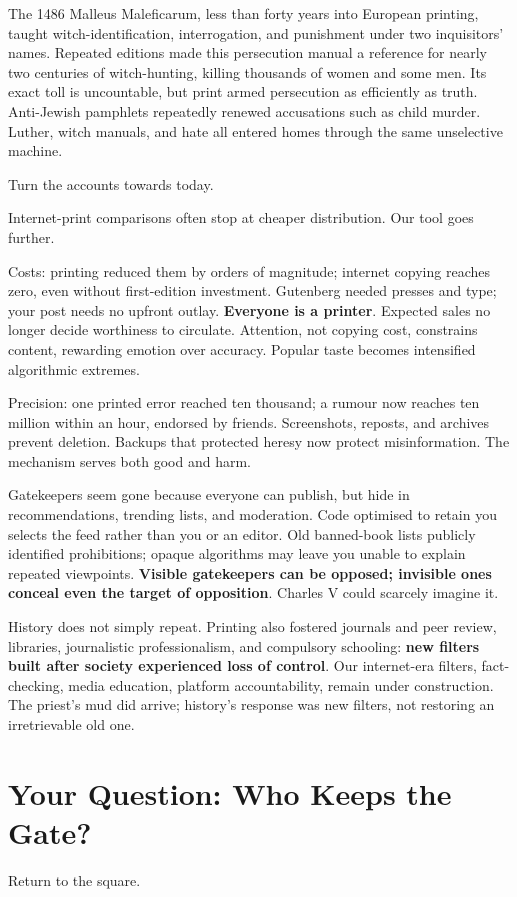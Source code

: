 The 1486 Malleus Maleficarum, less than forty years into European printing, taught witch-identification, interrogation, and punishment under two inquisitors' names. Repeated editions made this persecution manual a reference for nearly two centuries of witch-hunting, killing thousands of women and some men. Its exact toll is uncountable, but print armed persecution as efficiently as truth. Anti-Jewish pamphlets repeatedly renewed accusations such as child murder. Luther, witch manuals, and hate all entered homes through the same unselective machine.

Turn the accounts towards today.

Internet-print comparisons often stop at cheaper distribution. Our tool goes further.

Costs: printing reduced them by orders of magnitude; internet copying reaches zero, even without first-edition investment. Gutenberg needed presses and type; your post needs no upfront outlay. \textbf{Everyone is a printer}. Expected sales no longer decide worthiness to circulate. Attention, not copying cost, constrains content, rewarding emotion over accuracy. Popular taste becomes intensified algorithmic extremes.

Precision: one printed error reached ten thousand; a rumour now reaches ten million within an hour, endorsed by friends. Screenshots, reposts, and archives prevent deletion. Backups that protected heresy now protect misinformation. The mechanism serves both good and harm.

Gatekeepers seem gone because everyone can publish, but hide in recommendations, trending lists, and moderation. Code optimised to retain you selects the feed rather than you or an editor. Old banned-book lists publicly identified prohibitions; opaque algorithms may leave you unable to explain repeated viewpoints. \textbf{Visible gatekeepers can be opposed; invisible ones conceal even the target of opposition}. Charles V could scarcely imagine it.

History does not simply repeat. Printing also fostered journals and peer review, libraries, journalistic professionalism, and compulsory schooling: \textbf{new filters built after society experienced loss of control}. Our internet-era filters, fact-checking, media education, platform accountability, remain under construction. The priest's mud did arrive; history's response was new filters, not restoring an irretrievable old one.

\section{Your Question: Who Keeps the Gate?}
Return to the square.

